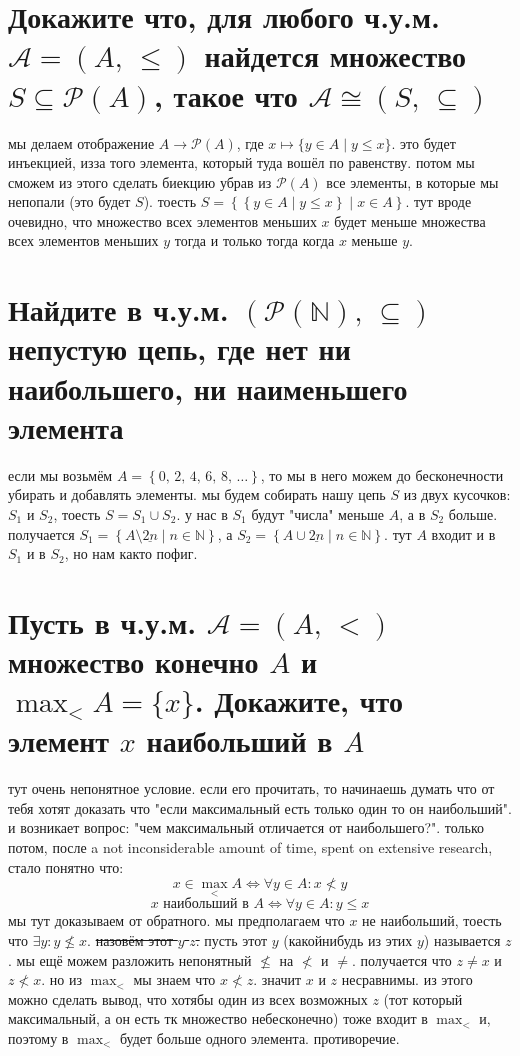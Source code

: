 \documentclass{article}
\newcommand{\N}{\mathbb{N}}
\newcommand{\range}{\underline}
\newcommand{\pe}[2]{({#1},\, {#2})}
\renewcommand{\l}{\left}
\renewcommand{\r}{\right}
\renewcommand{\P}[1]{\mathcal{P}\l(#1\r)}
\begin{document}
  \section{Докажите что, для любого ч.у.м. $\mathcal{A} = \pe{A}{\leq}$ найдется множество $S \subseteq \P{A}$, такое что $\mathcal{A} \cong \pe{S}{\subseteq}$}
  мы делаем отображение $A \to \P{A}$, где $x \mapsto \{y \in A \mid y \leq x\}$.
  это будет инъекцией, изза того элемента, который туда вошёл по равенству.
  потом мы сможем из этого сделать биекцию убрав из $\P{A}$ все элементы, в которые мы непопали (это будет $S$).
  тоесть $S = \l\{\l\{y \in A \mid y \leq x\r\} \mid x \in A\r\}$.
  тут вроде очевидно, что множество всех элементов меньших $x$ будет меньше множества всех элементов меньших $y$ тогда и только тогда когда $x$ меньше $y$.

  \section{Найдите в ч.у.м. $\pe{\P{\N}}{\subseteq}$ непустую цепь, где нет ни наибольшего, ни наименьшего элемента}
  если мы возьмём $A = \l\{0,\, 2,\, 4,\, 6,\, 8,\, \dots \r\}$, то мы в него можем до бесконечности убирать и добавлять элементы.
  мы будем собирать нашу цепь $S$ из двух кусочков: $S_1$ и $S_2$, тоесть $S = S_1 \cup S_2$.
  у нас в $S_1$ будут "{}числа"{} меньше $A$, а в $S_2$ больше.
  получается $S_1 = \l\{ A \setminus \range{2n} \mid n \in \N \r\}$,
  а $S_2 = \l\{ A \cup \range{2n} \mid n \in \N \r\}$.
  тут $A$ входит и в $S_1$ и в $S_2$, но нам както пофиг.

  \section{Пусть в ч.у.м. $\mathcal{A} = \pe{A}{<}$ множество конечно $A$ и $\max_< A = \{x\}$. Докажите, что элемент $x$ наибольший в $A$}
  тут очень непонятное условие.
  если его прочитать, то начинаешь думать что от тебя хотят доказать что "{}если максимальный есть только один то он наибольший"{}.
  и возникает вопрос: "{}чем максимальный отличается от наибольшего?"{}.
  только потом, после a not inconsiderable amount of time, spent on extensive research, стало понятно что:
  $$ x \in \operatorname{max}_{<} A \iff \forall y \in A: x \not< y $$
  $$ x \text{ наибольший в } A \iff \forall y \in A: y \leq x $$
  мы тут доказываем от обратного. мы предполагаем что $x$ не наибольший, тоесть что $\exists y: y \not\leq x$.
  \sout{назовём этот $y$ $z$.} пусть этот $y$ (какойнибудь из этих $y$) называется $z$.
  мы ещё можем разложить непонятный $\not\leq$ на $\not<$ и $\neq$. получается что $z \neq x$ и $z \not< x$.
  но из $\max_{<}$ мы знаем что $x \not< z$. значит $x$ и $z$ несравнимы.
  из этого можно сделать вывод, что хотябы один из всех возможных $z$ (тот который максимальный, а он есть тк множество небесконечно)
  тоже входит в $\max_{<}$ и, поэтому в $\max_{<}$ будет больше одного элемента. противоречие.
\end{document}
